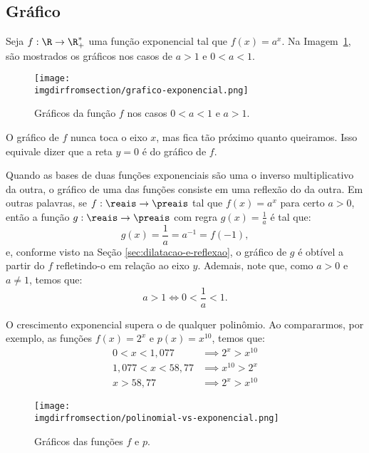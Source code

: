 \subsection{Gráfico}

\begin{example}
    Seja $f: \R \to \R_+^*$ uma função exponencial tal que $f(x) =
a^x$. Na Imagem~\ref{img:graficos-exponencial}, são mostrados os gráficos
nos casos de $a > 1$ e $0 < a < 1$.
%
\begin{figure}[H]
    \centering
    \texttt{[image: \\imgdirfromsection/grafico-exponencial.png]}
    \caption{Gráficos da função $f$ nos casos $0<a<1$ e $a>1$.}
    \label{img:graficos-exponencial}
\end{figure}
%
O gráfico de $f$ nunca toca o eixo $x$, mas fica tão próximo quanto
queiramos. Isso equivale dizer que a reta $y=0$ é  do
gráfico de $f$.
\end{example}

\begin{remark}
    Quando as bases de duas funções exponenciais são uma o inverso multiplicativo da outra, o gráfico de uma 
    das funções consiste em uma reflexão do da outra. Em outras palavras, se $f:\reais \to \preais$
    tal que $f(x) = a^x $ para certo $a > 0$, então a função $g:\reais \to \preais$ com regra 
    $g(x) = \frac 1 a$ é tal que:
    \[
        g(x) = \frac 1 a = a^{-1} = f(-1),    
    \]
    e, conforme visto na Seção \ref{sec:dilatacao-e-reflexao}, o gráfico de $g$ é obtível a partir do $f$ refletindo-o em relação ao eixo
    $y$. Ademais, note que, como $a > 0$ e $a \ne 1$, temos que:
    $$a > 1 \iff 0 < \frac{1}{a} < 1.$$
\end{remark}

\begin{example}
    O crescimento exponencial supera o de qualquer polinômio. Ao compararmos, por exemplo, as funções $f(x) = 2^x$ e $p(x)=x^{10}$, temos que:
    \begin{align*}
        0<x<1{,}077 & \implies  2^x > x^{10} \\
        1{,}077 < x < 58{,}77 & \implies  x^{10} > 2^x \\
        x>58{,}77 & \implies  2^x > x^{10}
    \end{align*}
\end{example}

\begin{figure}[H]
    \centering
    \texttt{[image: \\imgdirfromsection/polinomial-vs-exponencial.png]}
    \caption{Gráficos das funções $f$ e $p$.}
    \label{img:polinomial-vs-exponencial}
\end{figure}


